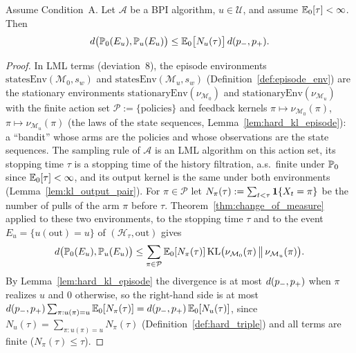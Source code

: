\begin{lemma}\label{lem:hard_change_of_measure}
\leanok
Assume Condition~A. Let $\mathcal A$ be a BPI algorithm, $u \in \mathcal U$, and assume
$\mathbb{E}_0[\tau] < \infty$. Then
\[
  d\big(\mathbb{P}_0(E_u), \mathbb{P}_u(E_u)\big) \le \mathbb{E}_0\big[N_u(\tau)\big]\,d(p_-, p_+) .
\]
\end{lemma}

\begin{proof}
\leanok
{}
In LML terms (deviation~8), the episode environments $\mathrm{statesEnv}(\mathcal M_0, s_w)$ and
$\mathrm{statesEnv}(\mathcal M_u, s_w)$ (Definition~\ref{def:episode_env}) are the stationary
environments $\mathrm{stationaryEnv}(\nu_{\mathcal M_0})$ and $\mathrm{stationaryEnv}(\nu_{\mathcal M_u})$
with the finite action set $\mathcal P := \{\text{policies}\}$ and feedback kernels
$\pi \mapsto \nu_{\mathcal M_0}(\pi)$, $\pi \mapsto \nu_{\mathcal M_u}(\pi)$ (the laws of the state
sequences, Lemma~\ref{lem:hard_kl_episode}): a ``bandit'' whose arms are the policies and whose
observations are the state sequences. The sampling rule of $\mathcal A$ is an LML algorithm on
this action set, its stopping time $\tau$ is a stopping time of the history filtration, a.s.\
finite under $\mathbb{P}_0$ since $\mathbb{E}_0[\tau] < \infty$, and its output kernel is the same under both
environments (Lemma~\ref{lem:kl_output_pair}). For $\pi \in \mathcal P$ let
$N_\pi(\tau) := \sum_{t < \tau}\mathbf{1}\{X_t = \pi\}$ be the number of pulls of the arm $\pi$
before $\tau$. Theorem~\ref{thm:change_of_measure} applied to these two environments, to the
stopping time $\tau$ and to the event $E_u = \{u(\mathrm{out}) = u\}$ of $(\mathcal H_\tau, \mathrm{out})$
gives
\[
  d\big(\mathbb{P}_0(E_u), \mathbb{P}_u(E_u)\big) \le \sum_{\pi \in \mathcal P}\mathbb{E}_0[N_\pi(\tau)]\,\mathrm{KL}\big(\nu_{\mathcal M_0}(\pi)\,\big\|\,\nu_{\mathcal M_u}(\pi)\big) .
\]
By Lemma~\ref{lem:hard_kl_episode} the divergence is at most $d(p_-,p_+)$ when $\pi$
realizes $u$ and $0$ otherwise, so the right-hand side is at most
$d(p_-,p_+)\sum_{\pi : u(\pi) = u}\mathbb{E}_0[N_\pi(\tau)] = d(p_-,p_+)\,\mathbb{E}_0[N_u(\tau)]$,
since $N_u(\tau) = \sum_{\pi : u(\pi) = u} N_\pi(\tau)$ (Definition~\ref{def:hard_triple}) and
all terms are finite ($N_\pi(\tau) \le \tau$).
\end{proof}

